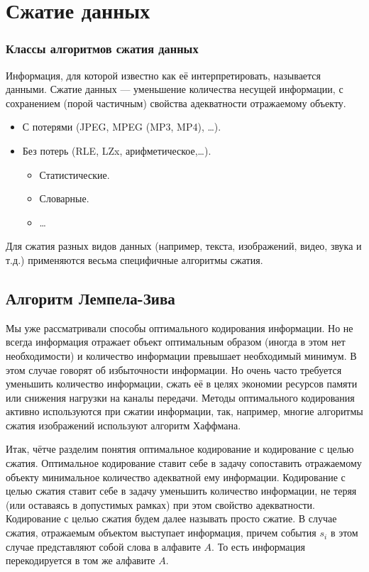 \section{Сжатие данных}


\begin{frame}
\frametitle{Классы алгоритмов сжатия данных}
\begin{definition}
    \alert{Информация}, для которой известно как её интерпретировать, называется \alert{данными}. \alert{Сжатие} данных --- уменьшение количества несущей информации, с сохранением (порой частичным) свойства \alert{адекватности} отражаемому объекту.
\end{definition}
\begin{itemize}
    \item С потерями (JPEG, MPEG (MP3, MP4), \ldots).
    \item Без потерь (RLE, LZx, арифметическое,\ldots).
    \begin{itemize}
        \item Статистические.
        \item Словарные.
        \item\ldots
    \end{itemize}
\end{itemize}
Для сжатия разных видов \alert{данных} (например, текста, изображений, видео, звука и т.д.) применяются весьма специфичные алгоритмы сжатия. 
\end{frame}


\subsection{Алгоритм Лемпела-Зива}


Мы уже рассматривали способы оптимального кодирования информации. Но не всегда информация отражает объект оптимальным образом (иногда в этом нет необходимости) и количество информации превышает необходимый минимум. В этом случае говорят об избыточности информации. Но очень часто требуется уменьшить количество информации, сжать её в целях экономии ресурсов памяти или снижения нагрузки на каналы передачи. Методы оптимального кодирования активно используются при сжатии информации, так, например, многие алгоритмы сжатия изображений используют алгоритм Хаффмана.

Итак, чётче разделим понятия оптимальное кодирование и кодирование с целью сжатия. Оптимальное кодирование ставит себе в задачу сопоставить отражаемому объекту минимальное количество адекватной ему информации. Кодирование с целью сжатия ставит себе в задачу уменьшить количество информации, не теряя (или оставаясь в допустимых рамках) при этом свойство адекватности. Кодирование с целью сжатия будем далее называть просто сжатие. В случае сжатия, отражаемым объектом выступает информация, причем события $s_i$ в этом случае представляют собой слова в алфавите $A$. То есть информация перекодируется в том же алфавите $A$.

